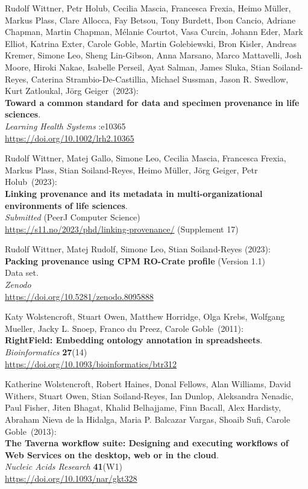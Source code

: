 \begin{thebibliography}{9}
Rudolf Wittner, Petr Holub, Cecilia Mascia, Francesca Frexia, Heimo Müller, Markus Plass, Clare Allocca, Fay Betsou, Tony Burdett, Ibon Cancio, Adriane Chapman, Martin Chapman, Mélanie Courtot, Vasa Curcin, Johann Eder, Mark Elliot, Katrina Exter, Carole Goble, Martin Golebiewski, Bron Kisler, Andreas Kremer, Simone Leo, Sheng Lin-Gibson, Anna Marsano, Marco Mattavelli, Josh Moore, Hiroki Nakae, Isabelle Perseil, Ayat Salman, James Sluka, Stian Soiland-Reyes, Caterina Strambio-De-Castillia, Michael Sussman, Jason R. Swedlow, Kurt Zatloukal, Jörg Geiger~(2023): \\
\textbf{Toward a common standard for data and specimen provenance in life sciences}.\\
\emph{Learning Health Systems} :e10365 \\
\url{https://doi.org/10.1002/lrh2.10365}

Rudolf Wittner, Matej Gallo, Simone Leo, Cecilia Mascia, Francesca Frexia, Markus Plass, Stian Soiland-Reyes, Heimo Müller, Jörg Geiger, Petr Holub~(2023): \\
\textbf{Linking provenance and its metadata in multi-organizational environments of life sciences}.\\
\emph{Submitted} (PeerJ Computer Science)\\
\url{https://s11.no/2023/phd/linking-provenance/}
(Supplement 17)

Rudolf Wittner, Matej Rudolf, Simone Leo, Stian Soiland-Reyes (2023): \\
\textbf{Packing provenance using CPM RO-Crate profile} (Version 1.1)\\
Data set.\\
\emph{Zenodo}\\
\url{https://doi.org/10.5281/zenodo.8095888}

Katy Wolstencroft, Stuart Owen, Matthew Horridge, Olga Krebs, Wolfgang Mueller, Jacky L. Snoep, Franco du Preez, Carole Goble~(2011): \\
\textbf{RightField: Embedding ontology annotation in spreadsheets}. \\
\emph{Bioinformatics} \textbf{27}(14) \\
\url{https://doi.org/10.1093/bioinformatics/btr312}

Katherine Wolstencroft, Robert Haines, Donal Fellows, Alan Williams, David Withers, Stuart Owen, Stian Soiland-Reyes, Ian Dunlop, Aleksandra Nenadic, Paul Fisher, Jiten Bhagat, Khalid Belhajjame, Finn Bacall, Alex Hardisty, Abraham Nieva de la Hidalga, Maria P. Balcazar Vargas, Shoaib Sufi, Carole Goble~(2013): \\
\textbf{The {Taverna} workflow suite: Designing
and executing workflows of {Web Services} on the desktop, web or in the
cloud}. \\
\emph{Nucleic Acids Research} \textbf{41}(W1) \\
\url{https://doi.org/10.1093/nar/gkt328}


\end{thebibliography}
